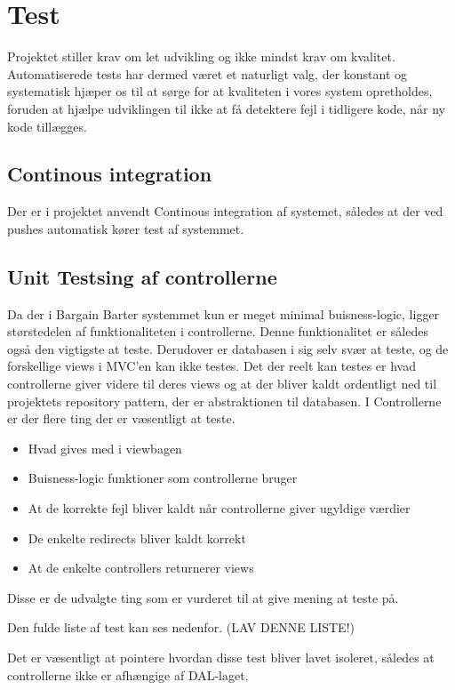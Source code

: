 \chapter{Test}

Projektet stiller krav om let udvikling og ikke mindst krav om kvalitet. Automatiserede tests har dermed været et naturligt valg, der konstant og systematisk hjæper os til at sørge for at kvaliteten i vores system opretholdes, foruden at hjælpe udviklingen til ikke at få detektere fejl i tidligere kode, når ny kode tillægges.

\section{Continous integration}
Der er i projektet anvendt Continous integration af systemet, således at der ved pushes automatisk kører test af systemmet.



\section{Unit Testsing af controllerne}
Da der i Bargain Barter systemmet kun er meget minimal buisness-logic, ligger størstedelen af funktionaliteten i controllerne. Denne funktionalitet er således også den vigtigste at teste. Derudover er databasen i sig selv svær at teste, og de forskellige views i MVC'en kan ikke testes. Det der reelt kan testes er hvad controllerne giver videre til deres views og at der bliver kaldt ordentligt ned til projektets repository pattern, der er abstraktionen til databasen. I Controllerne er der flere ting der er væsentligt at teste.
\begin{itemize}
	\item Hvad gives med i viewbagen
	\item Buisness-logic funktioner som controllerne bruger
	\item At de korrekte fejl bliver kaldt når controllerne giver ugyldige værdier
	\item De enkelte redirects bliver kaldt korrekt
	\item At de enkelte controllers returnerer views
\end{itemize}       
Disse er de udvalgte ting som er vurderet til at give mening at teste på.

Den fulde liste af test kan ses nedenfor.
(LAV DENNE LISTE!)

Det er væsentligt at pointere hvordan disse test bliver lavet isoleret, således at controllerne ikke er afhængige af DAL-laget.

